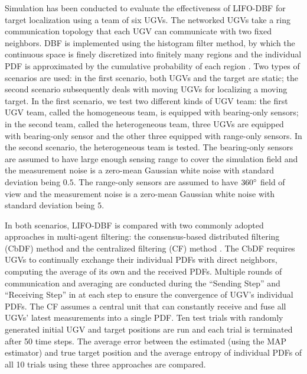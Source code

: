 \documentclass[journal]{IEEEtranTIE}
\theoremstyle{remark}
\begin{document}
	Simulation has been conducted to evaluate the effectiveness of LIFO-DBF for target localization using a team of six UGVs.
	The networked UGVs take a ring communication topology that each UGV can communicate with two fixed neighbors.
	DBF is implemented using the histogram filter method, by which the continuous space is finely discretized into finitely many regions and the individual PDF is approximated by the cumulative probability of each region \cite{thrun2005probabilistic}.
	Two types of scenarios are used: in the first scenario, both UGVs and the target are static;
	the second scenario subsequently deals with moving UGVs for localizing a moving target. 
	In the first scenario, we test two different kinds of UGV team: the first UGV team, called the homogeneous team, is equipped with bearing-only sensors; in the second team, called the heterogeneous team, three UGVs are equipped with bearing-only sensor and the other three equipped with range-only sensors.
	In the second scenario, the heterogeneous team is tested.
	The bearing-only sensors are assumed to have large enough sensing range to cover the simulation field and the measurement noise is a zero-mean Gaussian white noise with standard deviation being $0.5$.
	The range-only sensors are assumed to have $360\degree$ field of view and the measurement noise is a zero-mean Gaussian white noise with standard deviation being $5$.
	
	In both scenarios, LIFO-DBF is compared with two commonly adopted approaches in multi-agent filtering: the consensus-based distributed filtering (CbDF) method \cite{olfati2006belief} and the centralized filtering (CF) method \cite{veeravalli2012distributed}.
	The CbDF requires UGVs to continually exchange their individual PDFs with direct neighbors, computing the average of its own and the received PDFs. 
	Multiple rounds of communication and averaging are conducted during the ``Sending Step'' and ``Receiving Step'' in  at each step to ensure the convergence of UGV's individual PDFs.
	The CF assumes a central unit that can constantly receive and fuse all UGVs' latest measurements into a single PDF.
	Ten test trials with randomly generated initial UGV and target positions are run and each trial is terminated after 50 time steps.
	The average error between the estimated (using the MAP estimator) and true target position and the average entropy of individual PDFs of all 10 trials using these three approaches are compared.
	
\end{document}
